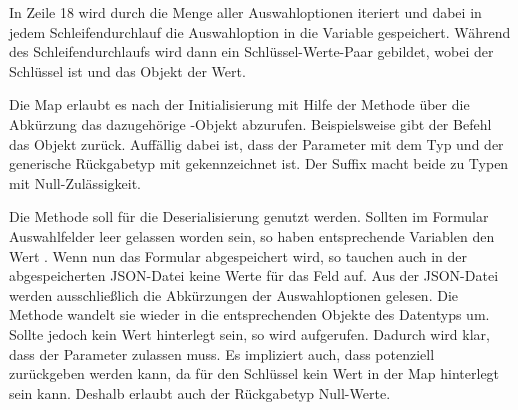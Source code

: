 In Zeile 18 wird durch die  Menge aller Auswahloptionen  iteriert und dabei in jedem Schleifendurchlauf die Auswahloption in die  Variable  gespeichert.
Während des Schleifendurchlaufs wird dann ein Schlüssel-Werte-Paar gebildet, wobei  der Schlüssel ist und das Objekt  der Wert.

Die Map  erlaubt es nach der Initialisierung mit Hilfe der Methode   über die Abkürzung das dazugehörige -Objekt abzurufen.
Beispielsweise gibt der Befehl  das Objekt  zurück. Auffällig dabei ist, dass der Parameter  mit dem Typ  und der generische Rückgabetyp mit  gekennzeichnet ist. Der Suffix  macht beide zu Typen mit Null-Zulässigkeit.



Die Methode  soll für die Deserialisierung genutzt werden.
 Sollten im Formular Auswahlfelder leer gelassen worden sein, so haben  entsprechende Variablen den Wert .
Wenn nun das Formular abgespeichert wird, so tauchen auch in der abgespeicherten JSON-Datei keine Werte für das Feld auf.
Aus der JSON-Datei werden ausschließlich die Abkürzungen der Auswahloptionen gelesen. Die Methode  wandelt sie wieder in die entsprechenden Objekte des Datentyps  um.
Sollte jedoch kein Wert hinterlegt sein, so wird  aufgerufen. Dadurch wird klar, dass der Parameter  zulassen muss. Es impliziert auch, dass potenziell  zurückgeben werden kann, da für den Schlüssel  kein Wert in der Map hinterlegt sein kann. Deshalb  erlaubt auch der Rückgabetyp  Null-Werte.

